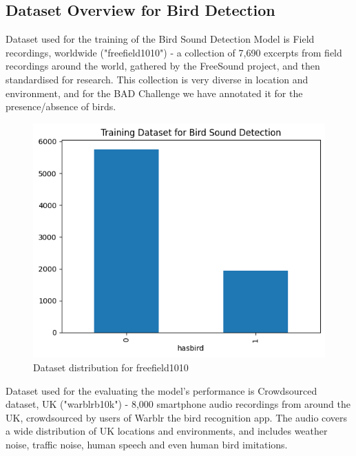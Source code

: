 \subsection{Dataset Overview for Bird Detection}
Dataset used for the training of the Bird Sound Detection Model is Field
recordings, worldwide ("freefield1010") - a collection of 7,690 excerpts from
field recordings around the world, gathered by the FreeSound project, and then
standardised for research. This collection is very diverse in location and
environment, and for the BAD Challenge we have annotated it for the
presence/absence of birds.
\begin{figure}[h!]
    \centering
    \includegraphics[scale=0.45]{images/det_trainingdataset.png}
    \caption{Dataset distribution for freefield1010}
    \label{fig:freefield1010 dataset}
\end{figure}
\newpage
Dataset used for the evaluating the model's performance is Crowdsourced
dataset, UK ("warblrb10k") - 8,000 smartphone audio recordings from around the
UK, crowdsourced by users of Warblr the bird recognition app. The audio covers
a wide distribution of UK locations and environments, and includes weather
noise, traffic noise, human speech and even human bird imitations.
